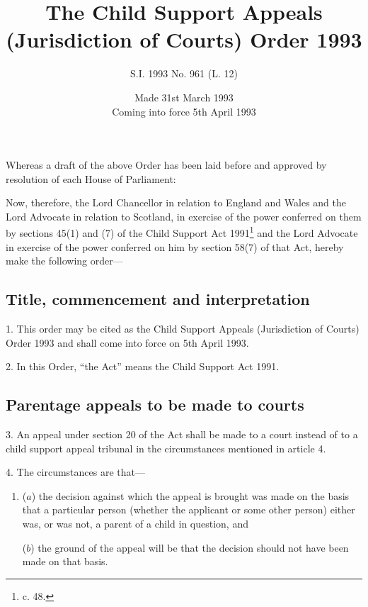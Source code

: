 \documentclass[a4paper]{article}
\title{The Child Support Appeals (Jurisdiction of Courts) Order 1993}
\author{S.I. 1993 No. 961 (L. 12)}
\date{Made 31st March 1993\\Coming into force 5th April 1993}
\begin{document}
\maketitle

\noindent
Whereas a draft of the above Order has been laid before and approved by resolution of each House of Parliament:

 Now, therefore, the Lord Chancellor in relation to England and Wales and the Lord Advocate in relation to Scotland, in exercise of the power conferred on them by sections 45(1) and (7) of the Child Support Act 1991\footnote{ c. 48.} and the Lord Advocate in exercise of the power conferred on him by section 58(7) of that Act, hereby make the following order—

{\sloppy

\tableofcontents

}

\setcounter{secnumdepth}{-2}

\subsection[1, 2. Title, commencement and interpretation]{Title, commencement and interpretation}

1.  This order may be cited as the Child Support Appeals (Jurisdiction of Courts) Order 1993 and shall come into force on 5th April 1993.

\medskip

2.  In this Order, “the Act” means the Child Support Act 1991.

\subsection[3--5. Parentage appeals to be made to courts]{Parentage appeals to be made to courts}

3.  An appeal under section 20 of the Act shall be made to a court instead of to a child support appeal tribunal in the circumstances mentioned in article 4.

\medskip

4.  The circumstances are that—
\begin{enumerate}\item[]
($a$) the decision against which the appeal is brought was made on the basis that a particular person (whether the applicant or some other person) either was, or was not, a parent of a child in question, and

($b$) the ground of the appeal will be that the decision should not have been made on that basis.
\end{enumerate}
\end{document}
